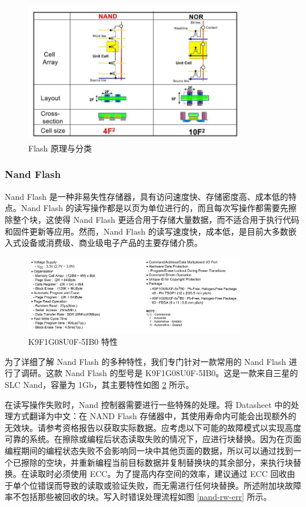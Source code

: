 \begin{figure}[htbp]
  \centering
  \includegraphics[width=0.85\textwidth]{fig/flash-nand-nor.jpg}
  \caption{Flash 原理与分类}
  \label{flash-nand-nor}
\end{figure}

\subsubsection{Nand Flash}

Nand Flash 是一种非易失性存储器，具有访问速度快、存储密度高、成本低的特点。Nand Flash 的读写操作都是以页为单位进行的，而且每次写操作都需要先擦除整个块，这使得 Nand Flash 更适合用于存储大量数据，而不适合用于执行代码和固件更新等应用。然而，Nand Flash 的读写速度快，成本低，是目前大多数嵌入式设备或消费级、商业级电子产品的主要存储介质。

\begin{figure}[htbp]
  \centering
  \includegraphics[width=0.85\textwidth]{fig/flash-nand-feature.png}
  \caption{K9F1G08U0F-5IB0 特性}
  \label{flash-nand-feature}
\end{figure}

为了详细了解 Nand Flash 的多种特性，我们专门针对一款常用的 Nand Flash 进行了调研。这款 Nand Flash 的型号是 K9F1G08U0F-5IB0。这是一款来自三星的 SLC Nand，容量为 1Gb，其主要特性如图 \ref{flash-nand-feature} 所示。

在读写操作失败时，Nand 控制器需要进行一些特殊的处理。将 Datasheet 中的处理方式翻译为中文：在 NAND Flash 存储器中，其使用寿命内可能会出现额外的无效块。请参考资格报告以获取实际数据。应考虑以下可能的故障模式以实现高度可靠的系统。在擦除或编程后状态读取失败的情况下，应进行块替换。因为在页面编程期间的编程状态失败不会影响同一块中其他页面的数据，所以可以通过找到一个已擦除的空块，并重新编程当前目标数据并复制替换块的其余部分，来执行块替换。在读取时必须使用 ECC。为了提高内存空间的效率，建议通过 ECC 回收由于单个位错误而导致的读取或验证失败，而无需进行任何块替换。所述附加块故障率不包括那些被回收的块。写入时错误处理流程如图 \ref{nand-rw-err} 所示。

